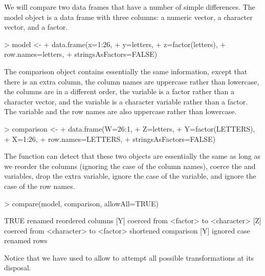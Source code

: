 We will compare two data frames that have a number of 
simple differences.  The model object is a data frame
with three columns:  a numeric vector, a character vector,
and a factor.

\begin{Schunk}
\begin{Sinput}
> model <- 
+     data.frame(x=1:26, 
+                y=letters, 
+                z=factor(letters),
+                row.names=letters,
+                stringsAsFactors=FALSE)
\end{Sinput}
\end{Schunk}
The comparison object contains essentially the same
information, except that there is an extra column, the
column names are uppercase rather than lowercase, the columns
are in a different order,
the  variable is a factor rather than a 
character vector, and the  variable is a
character variable rather than a factor.  The
 variable and the row names are also uppercase rather than lowercase.

\begin{Schunk}
\begin{Sinput}
> comparison <- 
+     data.frame(W=26:1,
+                Z=letters,
+                Y=factor(LETTERS), 
+                X=1:26, 
+                row.names=LETTERS,
+                stringsAsFactors=FALSE)
\end{Sinput}
\end{Schunk}
The  function can detect that these
two objects are essentially the same as long as
we reorder the columns (ignoring the case of the column names),
coerce the  and  variables, drop
the extra variable, ignore the case of the  variable,
and ignore the case of the row names.

\begin{Schunk}
\begin{Sinput}
> compare(model, comparison, allowAll=TRUE)
\end{Sinput}
\begin{Soutput}
TRUE
  renamed
  reordered columns
  [Y] coerced from <factor> to <character>
  [Z] coerced from <character> to <factor>
  shortened comparison
  [Y] ignored case
  renamed rows
\end{Soutput}
\end{Schunk}

Notice that we have used  to allow 
to attempt all possible transformations at its disposal.

